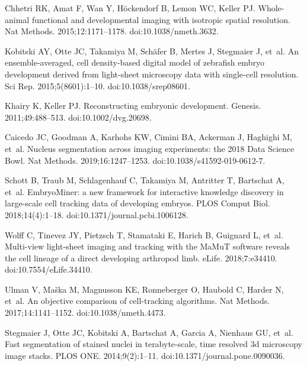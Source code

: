\documentclass[10pt,letterpaper]{article}
\begin{document}
\begin{thebibliography}{10}

Chhetri RK, Amat F, Wan Y, H{\"o}ckendorf B, Lemon WC, Keller PJ.
\newblock Whole-animal functional and developmental imaging with isotropic
  spatial resolution.
\newblock Nat Methods. 2015;12:1171--1178.
\newblock doi:{10.1038/nmeth.3632}.

Kobitski AY, Otte JC, Takamiya M, Schäfer B, Mertes J, Stegmaier J, et~al.
\newblock An ensemble-averaged, cell density-based digital model of zebrafish
  embryo development derived from light-sheet microscopy data with single-cell
  resolution.
\newblock Sci Rep. 2015;5(8601):1--10.
\newblock doi:{10.1038/srep08601}.

Khairy K, Keller PJ.
\newblock Reconstructing embryonic development.
\newblock Genesis. 2011;49:488--513.
\newblock doi:{10.1002/dvg.20698}.

Caicedo JC, Goodman A, Karhohs KW, Cimini BA, Ackerman J, Haghighi M, et~al.
\newblock Nucleus segmentation across imaging experiments: the 2018 Data
  Science Bowl.
\newblock Nat Methods. 2019;16:1247--1253.
\newblock doi:{10.1038/s41592-019-0612-7}.

Schott B, Traub M, Schlagenhauf C, Takamiya M, Antritter T, Bartschat A, et~al.
\newblock Embryo{M}iner: a new framework for interactive knowledge discovery in
  large-scale cell tracking data of developing embryos.
\newblock PLOS Comput Biol. 2018;14(4):1--18.
\newblock doi:{10.1371/journal.pcbi.1006128}.

Wolff C, Tinevez JY, Pietzsch T, Stamataki E, Harich B, Guignard L, et~al.
\newblock Multi-view light-sheet imaging and tracking with the {MaMuT} software
  reveals the cell lineage of a direct developing arthropod limb.
\newblock eLife. 2018;7:e34410.
\newblock doi:{10.7554/eLife.34410}.

Ulman V, Ma{\v{s}}ka M, Magnusson KE, Ronneberger O, Haubold C, Harder N,
  et~al.
\newblock An objective comparison of cell-tracking algorithms.
\newblock Nat Methods. 2017;14:1141--1152.
\newblock doi:{10.1038/nmeth.4473}.

Stegmaier J, Otte JC, Kobitski A, Bartschat A, Garcia A, Nienhaus GU, et~al.
\newblock Fast segmentation of stained nuclei in terabyte-scale, time resolved
  3d microscopy image stacks.
\newblock PLOS ONE. 2014;9(2):1--11.
\newblock doi:{10.1371/journal.pone.0090036}.


\end{thebibliography}
\end{document}
